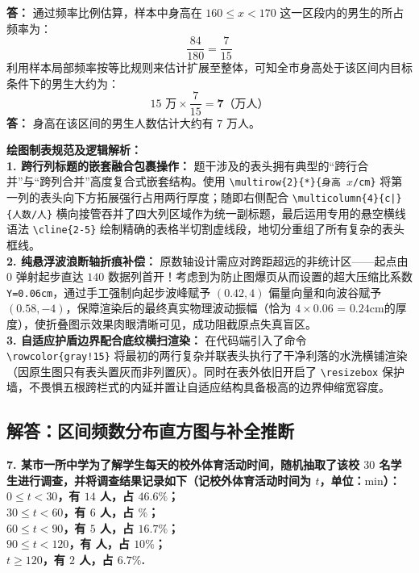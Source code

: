 \vspace{0.2cm}
\textbf{答：} 通过频率比例估算，样本中身高在 $160 \leqslant x < 170$ 这一区段内的男生的所占频率为：
$$\frac{84}{180} = \frac{7}{15}$$
利用样本局部频率按等比规则来估计扩展至整体，可知全市身高处于该区间内目标条件下的男生大约为：
$$15\text{ 万} \times \frac{7}{15} = \boldsymbol{7}\text{（万人）}$$
\textbf{答：} 身高在该区间的男生人数估计大约有 $7$ 万人。

\vspace{0.6cm}

{\small\color{blue!70!black}
\textbf{绘图制表规范及逻辑解析：}\\
\textbf{1. 跨行列标题的嵌套融合包裹操作：} 题干涉及的表头拥有典型的“跨行合并”与“跨列合并”高度复合式嵌套结构。使用 \texttt{\textbackslash multirow\{2\}\{*\}\{身高 $x$/cm\}} 将第一列的表头向下方拓展强行占用两行厚度；随即右侧配合 \texttt{\textbackslash multicolumn\{4\}\{c|\}\{人数/人\}} 横向接管吞并了四大列区域作为统一副标题，最后运用专用的悬空横线语法 \texttt{\textbackslash cline\{2-5\}} 绘制精确的表格半切割虚线段，地切分重组了所有复杂的表头框线。\\
\textbf{2. 纯悬浮波浪断轴折痕补偿：} 原数轴设计需应对跨距超远的非统计区——起点由 $0$ 弹射起步直达 $140$ 数据列首开！考虑到为防止图爆页从而设置的超大压缩比系数 \texttt{Y=0.06cm}，通过手工强制向起步波峰赋予 $(0.42, 4)$ 偏量向量和向波谷赋予 $(0.58, -4)$，保障渲染后的最终真实物理波动振幅（恰为 $4 \times 0.06$ = $0.24\text{cm}$的厚度），使折叠图示效果肉眼清晰可见，成功阻截原点失真盲区。\\
\textbf{3. 自适应护盾边界配合底纹横扫渲染：} 在代码端引入了命令 \texttt{\textbackslash rowcolor\{gray!15\}} 将最初的两行复杂并联表头执行了干净利落的水洗横铺渲染（因原生图只有表头置灰而非列置灰）。同时在表外依旧开启了 \texttt{\textbackslash resizebox} 保护墙，不畏惧五根跨栏式的内延并置让自适应结构具备极高的边界伸缩宽容度。
}

\newpage

\newpage

\subsection{解答：区间频数分布直方图与补全推断}

\vspace{0.6cm}

\textbf{7. 某市一所中学为了解学生每天的校外体育活动时间，随机抽取了该校 $30$ 名学生进行调查，并将调查结果记录如下（记校外体育活动时间为 $t$，单位：$\text{min}$）：\\
$0 \leqslant t < 30$，有 $14$ 人，占 $46.6\%$；\\
$30 \leqslant t < 60$，有 $6$ 人，占 \underline{\makebox[1.5cm]{}} $\%$；\\
$60 \leqslant t < 90$，有 $5$ 人，占 $16.7\%$；\\
$90 \leqslant t < 120$，有 \underline{\makebox[1.5cm]{}} 人，占 $10\%$；\\
$t \geqslant 120$，有 $2$ 人，占 $6.7\%$. }

